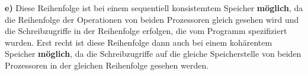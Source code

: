 \textbf{e)} Diese Reihenfolge ist bei einem sequentiell konsistemtem Speicher \textbf{möglich}, da die Reihenfolge der Operationen von beiden Prozessoren gleich gesehen wird und die Schreibzugriffe in der Reihenfolge erfolgen, die vom Programm spezifiziert wurden. Erst recht ist diese Reihenfolge dann auch bei einem kohärentem Speicher \textbf{möglich}, da die Schreibzugriffe auf die gleiche Speicherstelle von beiden Prozessoren in der gleichen Reihenfolge gesehen werden.